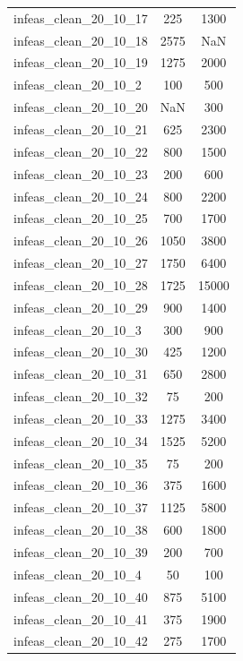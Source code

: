 \begin{longtable}{lcc}
infeas\_clean\_20\_10\_17  &      225 &   1300 \\
infeas\_clean\_20\_10\_18  &     2575 &    NaN \\
infeas\_clean\_20\_10\_19  &     1275 &   2000 \\
infeas\_clean\_20\_10\_2   &      100 &    500 \\
infeas\_clean\_20\_10\_20  &      NaN &    300 \\
infeas\_clean\_20\_10\_21  &      625 &   2300 \\
infeas\_clean\_20\_10\_22  &      800 &   1500 \\
infeas\_clean\_20\_10\_23  &      200 &    600 \\
infeas\_clean\_20\_10\_24  &      800 &   2200 \\
infeas\_clean\_20\_10\_25  &      700 &   1700 \\
infeas\_clean\_20\_10\_26  &     1050 &   3800 \\
infeas\_clean\_20\_10\_27  &     1750 &   6400 \\
infeas\_clean\_20\_10\_28  &     1725 &  15000 \\
infeas\_clean\_20\_10\_29  &      900 &   1400 \\
infeas\_clean\_20\_10\_3   &      300 &    900 \\
infeas\_clean\_20\_10\_30  &      425 &   1200 \\
infeas\_clean\_20\_10\_31  &      650 &   2800 \\
infeas\_clean\_20\_10\_32  &       75 &    200 \\
infeas\_clean\_20\_10\_33  &     1275 &   3400 \\
infeas\_clean\_20\_10\_34  &     1525 &   5200 \\
infeas\_clean\_20\_10\_35  &       75 &    200 \\
infeas\_clean\_20\_10\_36  &      375 &   1600 \\
infeas\_clean\_20\_10\_37  &     1125 &   5800 \\
infeas\_clean\_20\_10\_38  &      600 &   1800 \\
infeas\_clean\_20\_10\_39  &      200 &    700 \\
infeas\_clean\_20\_10\_4   &       50 &    100 \\
infeas\_clean\_20\_10\_40  &      875 &   5100 \\
infeas\_clean\_20\_10\_41  &      375 &   1900 \\
infeas\_clean\_20\_10\_42  &      275 &   1700 \\

\end{longtable}

